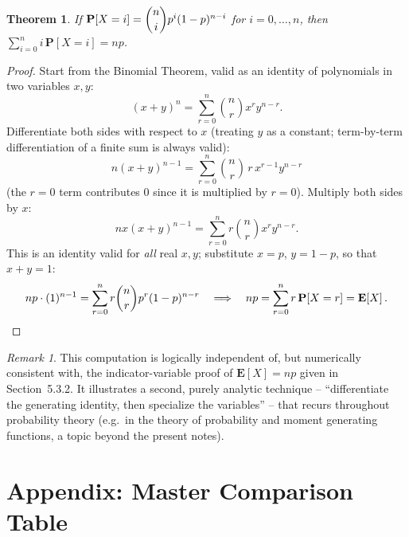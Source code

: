 \documentclass[11pt]{article}
\theoremstyle{definition}
\theoremstyle{plain}
\newtheorem{theorem}[definition]{Theorem}
\theoremstyle{remark}
\newtheorem{remark}[definition]{Remark}
\newcommand{\E}[1]{\mathbf{E}\!\left[#1\right]}
\begin{document}
\begin{theorem}
If $\mathbf{P}[X=i]=\dbinom{n}{i}p^i(1-p)^{n-i}$ for $i=0,\dots,n$, then
$\displaystyle\sum_{i=0}^n i\,\mathbf{P}[X=i] = np$.
\end{theorem}
\begin{proof}
Start from the Binomial Theorem, valid as an identity of polynomials in two variables $x,y$:
\[
(x+y)^n = \sum_{r=0}^n \binom{n}{r}x^r y^{n-r}.
\]
Differentiate both sides with respect to $x$ (treating $y$ as a constant; term-by-term
differentiation of a finite sum is always valid):
\[
n(x+y)^{n-1} = \sum_{r=0}^n \binom{n}{r}\,r\,x^{r-1}y^{n-r}
\]
(the $r=0$ term contributes $0$ since it is multiplied by $r=0$). Multiply both sides by $x$:
\[
nx(x+y)^{n-1} = \sum_{r=0}^n r\binom{n}{r}x^r y^{n-r}.
\]
This is an identity valid for \emph{all} real $x,y$; substitute $x=p$, $y=1-p$, so that
$x+y=1$:
\[
np\cdot(1)^{n-1} = \sum_{r=0}^n r\binom{n}{r}p^r(1-p)^{n-r}
\quad\Longrightarrow\quad
np = \sum_{r=0}^n r\,\mathbf{P}[X=r] = \E{X}. \qedhere
\]
\end{proof}

\begin{remark}
This computation is logically independent of, but numerically consistent with, the
indicator-variable proof of $\E{X}=np$ given in Section~5.3.2. It illustrates a second, purely
analytic technique -- ``differentiate the generating identity, then specialize the variables'' --
that recurs throughout probability theory (e.g.\ in the theory of probability and moment
generating functions, a topic beyond the present notes).
\end{remark}

\newpage
\section*{Appendix: Master Comparison Table}
\end{document}

